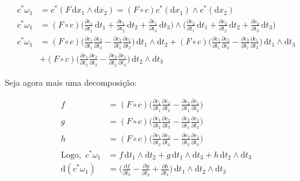 \documentclass[12pt,a4paper]{article}
\begin{document}
		\begin{align}
			c^*\omega_1 &= c^*(F \,\mathrm{d}x_1 \wedge\mathrm{d}x_2) = (F \circ c) c^*(\mathrm{d}x_1) \wedge c^*(\mathrm{d}x_2) \label{VinteNove} \\
			c^*\omega_1 &= (F \circ c) \biggl(\frac{\partial c_1}{\partial t_1} \,\mathrm{d}t_1 + \frac{\partial c_1}{\partial t_2} \,\mathrm{d}t_2 + \frac{\partial c_1}{\partial t_3} \,\mathrm{d}t_3 \biggl)  
				\wedge \biggl(\frac{\partial c_2}{\partial t_1} \,\mathrm{d}t_1 + \frac{\partial c_2}{\partial t_2} \,\mathrm{d}t_2 + \frac{\partial c_2}{\partial t_3} \,\mathrm{d}t_3 \biggl) \\
			c^*\omega_1 &= (F \circ c) \biggl(\frac{\partial c_1}{\partial t_1} \frac{\partial c_2}{\partial t_2} - \frac{\partial c_2}{\partial t_1} \frac{\partial c_1}{\partial t_2} \biggl) \,\mathrm{d}t_1 \wedge \mathrm{d}t_2
				+ (F \circ c) \biggl(\frac{\partial c_1}{\partial t_1} \frac{\partial c_2}{\partial t_3} - \frac{\partial c_2}{\partial t_1} \frac{\partial c_1}{\partial t_3} \biggl) \,\mathrm{d}t_1 \wedge \mathrm{d}t_3 \\
				&+ (F \circ c) \biggl(\frac{\partial c_1}{\partial t_2} \frac{\partial c_2}{\partial t_3} - \frac{\partial c_2}{\partial t_2} \frac{\partial c_1}{\partial t_3} \biggl) \,\mathrm{d}t_2 \wedge \mathrm{d}t_3 
		\end{align}	
				
		Seja agora mais uma decomposi\c{c}\~ao:
			
		\begin{align}
			f &= (F \circ c) \biggl(\frac{\partial c_1}{\partial t_1} \frac{\partial c_2}{\partial t_2} - \frac{\partial c_2}{\partial t_1} \frac{\partial c_1}{\partial t_2} \biggl) \\
			g &= (F \circ c) \biggl(\frac{\partial c_1}{\partial t_1} \frac{\partial c_2}{\partial t_3} - \frac{\partial c_2}{\partial t_1} \frac{\partial c_1}{\partial t_3} \biggl) \\
			h	&= (F \circ c) \biggl(\frac{\partial c_1}{\partial t_2} \frac{\partial c_2}{\partial t_3} - \frac{\partial c_2}{\partial t_2} \frac{\partial c_1}{\partial t_3} \biggl) \\		
			\mathrm{Logo,\,\,} c^*\omega_1 &= f \,\mathrm{d}t_1 \wedge \mathrm{d}t_2 + g \,\mathrm{d}t_1 \wedge \mathrm{d}t_3 + h \,\mathrm{d}t_2 \wedge \mathrm{d}t_3 \\
			\mathrm{d}(c^*\omega_1) &= \biggl( \frac{\partial f}{\partial t_3} - \frac{\partial g}{\partial t_2} + \frac{\partial h}{\partial t_1} \biggl) \,\mathrm{d}t_1 \wedge \mathrm{d}t_2 \wedge \mathrm{d}t_3 \label{TrintaQuatro}			
		\end{align}	
		
\end{document}

